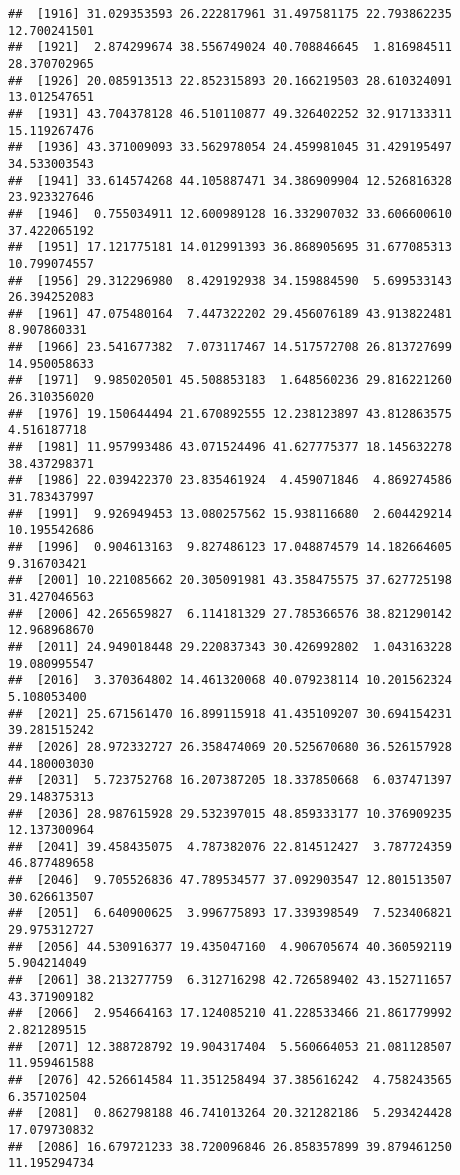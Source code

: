 \documentclass[
]{article}
\begin{document}
\begin{verbatim}
##  [1916] 31.029353593 26.222817961 31.497581175 22.793862235 12.700241501
##  [1921]  2.874299674 38.556749024 40.708846645  1.816984511 28.370702965
##  [1926] 20.085913513 22.852315893 20.166219503 28.610324091 13.012547651
##  [1931] 43.704378128 46.510110877 49.326402252 32.917133311 15.119267476
##  [1936] 43.371009093 33.562978054 24.459981045 31.429195497 34.533003543
##  [1941] 33.614574268 44.105887471 34.386909904 12.526816328 23.923327646
##  [1946]  0.755034911 12.600989128 16.332907032 33.606600610 37.422065192
##  [1951] 17.121775181 14.012991393 36.868905695 31.677085313 10.799074557
##  [1956] 29.312296980  8.429192938 34.159884590  5.699533143 26.394252083
##  [1961] 47.075480164  7.447322202 29.456076189 43.913822481  8.907860331
##  [1966] 23.541677382  7.073117467 14.517572708 26.813727699 14.950058633
##  [1971]  9.985020501 45.508853183  1.648560236 29.816221260 26.310356020
##  [1976] 19.150644494 21.670892555 12.238123897 43.812863575  4.516187718
##  [1981] 11.957993486 43.071524496 41.627775377 18.145632278 38.437298371
##  [1986] 22.039422370 23.835461924  4.459071846  4.869274586 31.783437997
##  [1991]  9.926949453 13.080257562 15.938116680  2.604429214 10.195542686
##  [1996]  0.904613163  9.827486123 17.048874579 14.182664605  9.316703421
##  [2001] 10.221085662 20.305091981 43.358475575 37.627725198 31.427046563
##  [2006] 42.265659827  6.114181329 27.785366576 38.821290142 12.968968670
##  [2011] 24.949018448 29.220837343 30.426992802  1.043163228 19.080995547
##  [2016]  3.370364802 14.461320068 40.079238114 10.201562324  5.108053400
##  [2021] 25.671561470 16.899115918 41.435109207 30.694154231 39.281515242
##  [2026] 28.972332727 26.358474069 20.525670680 36.526157928 44.180003030
##  [2031]  5.723752768 16.207387205 18.337850668  6.037471397 29.148375313
##  [2036] 28.987615928 29.532397015 48.859333177 10.376909235 12.137300964
##  [2041] 39.458435075  4.787382076 22.814512427  3.787724359 46.877489658
##  [2046]  9.705526836 47.789534577 37.092903547 12.801513507 30.626613507
##  [2051]  6.640900625  3.996775893 17.339398549  7.523406821 29.975312727
##  [2056] 44.530916377 19.435047160  4.906705674 40.360592119  5.904214049
##  [2061] 38.213277759  6.312716298 42.726589402 43.152711657 43.371909182
##  [2066]  2.954664163 17.124085210 41.228533466 21.861779992  2.821289515
##  [2071] 12.388728792 19.904317404  5.560664053 21.081128507 11.959461588
##  [2076] 42.526614584 11.351258494 37.385616242  4.758243565  6.357102504
##  [2081]  0.862798188 46.741013264 20.321282186  5.293424428 17.079730832
##  [2086] 16.679721233 38.720096846 26.858357899 39.879461250 11.195294734

\end{verbatim}
\end{document}
